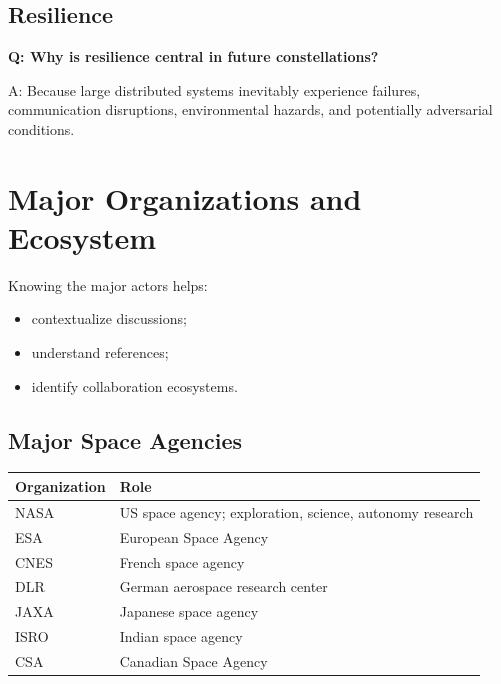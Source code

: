 \documentclass[10pt,a4paper,twocolumn]{article}
\begin{document}
\subsection{Resilience}

\begin{questionbox}
    \textbf{Q: Why is resilience central in future constellations?}

    A: Because large distributed systems inevitably experience failures, communication disruptions, environmental hazards, and potentially adversarial conditions.
\end{questionbox}



\section{Major Organizations and Ecosystem}

Knowing the major actors helps:
\begin{itemize}
    \item contextualize discussions;
    \item understand references;
    \item identify collaboration ecosystems.
\end{itemize}


\subsection{Major Space Agencies}

\begin{tabularx}{\columnwidth}{lX}
    \toprule
    Organization & Role                                                     \\
    \midrule
    NASA         & US space agency; exploration, science, autonomy research \\
    ESA          & European Space Agency                                    \\
    CNES         & French space agency                                      \\
    DLR          & German aerospace research center                         \\
    JAXA         & Japanese space agency                                    \\
    ISRO         & Indian space agency                                      \\
    CSA          & Canadian Space Agency                                    \\
    \bottomrule
\end{tabularx}
\end{document}
